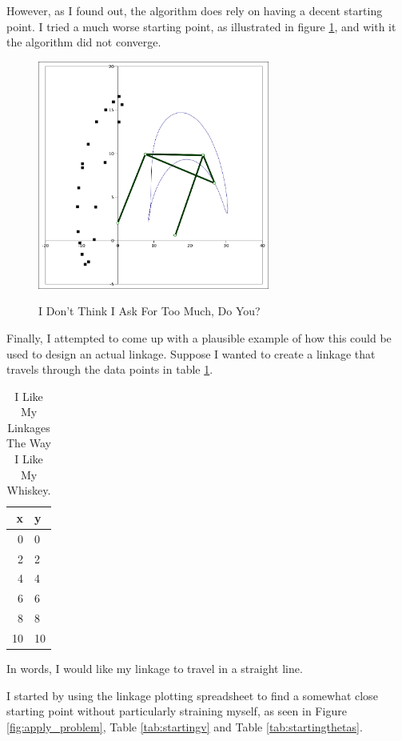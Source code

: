 \documentclass[12pt, letterpaper]{article}
\begin{document}
However, as I found out, the algorithm does rely on having a decent starting point.  I tried a much worse starting point, as illustrated in figure \ref{fig:bad_problem}, and with it the algorithm did not converge.

\begin{figure}[H]
\centering
\caption{I Don't Think I Ask For Too Much, Do You?}
\includegraphics[width=3.0in]{bad_problem}
\label{fig:bad_problem}
\end{figure}

Finally, I attempted to come up with a plausible example of how this could be used to design an actual linkage. Suppose I wanted to create a linkage that travels through the data points in table \ref{tab:datapoints}.

\begin{table}[H]
    \centering
    \caption{I Like My Linkages The Way I Like My Whiskey.}
    \begin{tabular}{r l}
    x & y \\ \hline
    0 & 0\\
    2 & 2\\
    4 & 4\\
    6 & 6\\
    8 & 8\\
    10 & 10
    \end{tabular}
    \label{tab:datapoints}
\end{table}

In words, I would like my linkage to travel in a straight line.

I started by using the linkage plotting spreadsheet to find a somewhat close starting point without particularly straining myself, as seen in Figure \ref{fig:apply_problem}, Table \ref{tab:startingv} and Table \ref{tab:startingthetas}.
\end{document}
